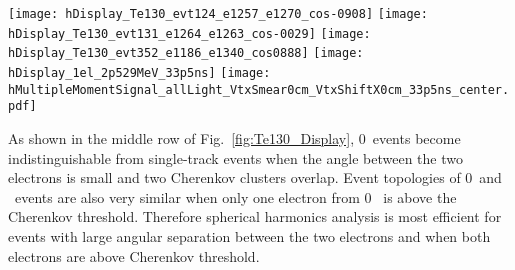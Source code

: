 \begin{figure*}[h]
  \centering
  \texttt{[image: hDisplay\_Te130\_evt124\_e1257\_e1270\_cos-0908]}
  \texttt{[image: hDisplay\_Te130\_evt131\_e1264\_e1263\_cos-0029]}
  \texttt{[image: hDisplay\_Te130\_evt352\_e1186\_e1340\_cos0888]}
  \texttt{[image: hDisplay\_1el\_2p529MeV\_33p5ns]}
  \texttt{[image: hMultipleMomentSignal\_allLight\_VtxSmear0cm\_VtxShiftX0cm\_33p5ns\_center.pdf]} 
  \caption{ \emph{Top and middle rows:} Event display examples for {\Te} 0{\nbb}-decay signal and {\B} background events.
    The default QE and the time cut of 33.5~ns are applied to both Cherenkov (\emph{triangles}) and scintillation (\emph{crosses}) 
    photons. For the {\Te} 0{\nbb}-decay signal three representative events are shown each closely matching on of the three
    topologies. A typical single electron event is shown for the {\B} background.
    \emph{Top left:} $^{130}$Te 0{\nbb}-decay back-to-back electrons: $E_1$=1.257~MeV, $E_2$=1.270~MeV, 
    cos($\theta$)=-0.908. \emph{Top right:} $^{130}$Te 0{\nbb}-decay electrons at $\sim$90$^{\circ}$: $E_1$=1.264~MeV, $E_2$=1.263~MeV,
    cos($\theta$)=-0.029. \emph{Middle left:} $^{130}$Te 0{\nbb}-decay electrons at $\sim$0$^{\circ}$: $E_1$=1.186~MeV, $E_2$=1.340~MeV,
    cos($\theta$)=0.888. \emph{Middle right:} 2.529~MeV single electron. In all events electrons originate at the center of the detector.
    \emph{Bottom panel:} Normalized power spectrum $S_l$ calculated for distribution of all PE after the 33.5~ns time cut. 
    {\Te} 0{\nbb}-decay signal (\emph{solid red line}) and {\B} background (\emph{dashed blue line}) topologies are compared.
    Simulation of 1000 signal and background events. The normalized power values $S_l$'s were calculated for each individual event. 
    The horizontal lines correspond to the mean values of $S_l$. The vertical bars show one standard deviation 
    from the mean value.}
\label{fig:Te130_Display}
\end{figure*}


As shown in the middle row of Fig.~\ref{fig:Te130_Display}, 0\nbb~events become indistinguishable from single-track events when the 
angle between the two electrons is small and two Cherenkov clusters overlap. Event topologies of 0\nbb~and \B~events are also 
very similar when only one electron from 0\nbb~ is above the Cherenkov threshold. Therefore spherical harmonics analysis is most 
efficient for events with large angular separation between the two electrons and when both electrons are above Cherenkov threshold.

